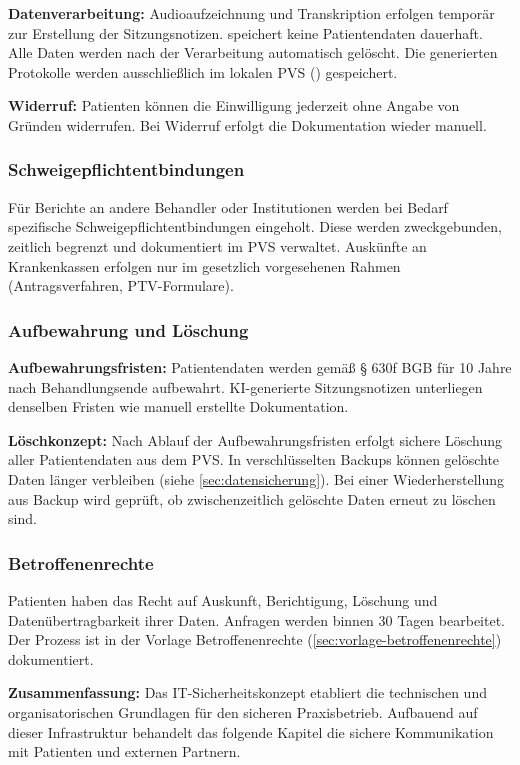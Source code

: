 \textbf{Datenverarbeitung:} Audioaufzeichnung und Transkription erfolgen temporär zur
Erstellung der Sitzungsnotizen. \KIToolName{} speichert keine Patientendaten dauerhaft.
Alle Daten werden nach der Verarbeitung automatisch gelöscht. Die generierten Protokolle
werden ausschließlich im lokalen PVS (\PVSName{}) gespeichert.

\textbf{Widerruf:} Patienten können die Einwilligung jederzeit ohne Angabe von Gründen
widerrufen. Bei Widerruf erfolgt die Dokumentation wieder manuell.

\subsubsection{Schweigepflichtentbindungen}

Für Berichte an andere Behandler oder Institutionen werden bei Bedarf spezifische
Schweigepflichtentbindungen eingeholt. Diese werden zweckgebunden, zeitlich begrenzt
und dokumentiert im PVS verwaltet. Auskünfte an Krankenkassen erfolgen nur im
gesetzlich vorgesehenen Rahmen (Antragsverfahren, PTV-Formulare).

\subsubsection{Aufbewahrung und Löschung}

\textbf{Aufbewahrungsfristen:} Patientendaten werden gemäß § 630f BGB für 10 Jahre nach
Behandlungsende aufbewahrt. KI-generierte Sitzungsnotizen unterliegen denselben Fristen
wie manuell erstellte Dokumentation.

\textbf{Löschkonzept:} Nach Ablauf der Aufbewahrungsfristen erfolgt sichere Löschung
aller Patientendaten aus dem PVS. In verschlüsselten Backups können gelöschte Daten
länger verbleiben (siehe \cref{sec:datensicherung}). Bei einer Wiederherstellung aus
Backup wird geprüft, ob zwischenzeitlich gelöschte Daten erneut zu löschen sind.

\subsubsection{Betroffenenrechte}

Patienten haben das Recht auf Auskunft, Berichtigung, Löschung und Datenübertragbarkeit
ihrer Daten. Anfragen werden binnen 30 Tagen bearbeitet. Der Prozess ist in der
Vorlage Betroffenenrechte (\cref{sec:vorlage-betroffenenrechte}) dokumentiert.

\textbf{Zusammenfassung:} Das IT-Sicherheitskonzept etabliert die technischen und
organisatorischen Grundlagen für den sicheren Praxisbetrieb. Aufbauend auf dieser
Infrastruktur behandelt das folgende Kapitel die sichere Kommunikation mit Patienten
und externen Partnern.
